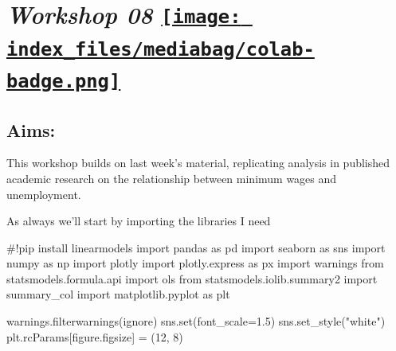 \documentclass[
  letterpaper,
  DIV=11,
  numbers=noendperiod]{scrreprt}
\newenvironment{Shaded}{\begin{snugshade}}{\end{snugshade}}
\newcommand{\BuiltInTok}[1]{\textcolor[rgb]{0.00,0.23,0.31}{#1}}
\newcommand{\CommentTok}[1]{\textcolor[rgb]{0.37,0.37,0.37}{#1}}
\newcommand{\DecValTok}[1]{\textcolor[rgb]{0.68,0.00,0.00}{#1}}
\newcommand{\FloatTok}[1]{\textcolor[rgb]{0.68,0.00,0.00}{#1}}
\newcommand{\ImportTok}[1]{\textcolor[rgb]{0.00,0.46,0.62}{#1}}
\newcommand{\NormalTok}[1]{\textcolor[rgb]{0.00,0.23,0.31}{#1}}
\newcommand{\OperatorTok}[1]{\textcolor[rgb]{0.37,0.37,0.37}{#1}}
\newcommand{\StringTok}[1]{\textcolor[rgb]{0.13,0.47,0.30}{#1}}
\begin{document}
\hypertarget{workshop-08-open-in-colab}{%
\section[\emph{Workshop 08} ]{\texorpdfstring{\emph{Workshop 08}
\href{https://colab.research.google.com/github/oballinger/QM2/blob/main/notebooks/W08.\%20Diff-in-Diff.ipynb}{\protect\texttt{[image: index\_files/mediabag/colab-badge.png]}}}{Workshop 08 Open In Colab}}\label{workshop-08-open-in-colab}}

\hypertarget{aims-6}{%
\subsection{Aims:}\label{aims-6}}

This workshop builds on last week's material, replicating analysis in
published academic research on the relationship between minimum wages
and unemployment.

As always we'll start by importing the libraries I need

\begin{Shaded}
\begin{Highlighting}[]
\CommentTok{\#!pip install linearmodels}
\ImportTok{import}\NormalTok{ pandas }\ImportTok{as}\NormalTok{ pd}
\ImportTok{import}\NormalTok{ seaborn }\ImportTok{as}\NormalTok{ sns}
\ImportTok{import}\NormalTok{ numpy }\ImportTok{as}\NormalTok{ np}
\ImportTok{import}\NormalTok{ plotly}
\ImportTok{import}\NormalTok{ plotly.express }\ImportTok{as}\NormalTok{ px}
\ImportTok{import}\NormalTok{ warnings}
\ImportTok{from}\NormalTok{ statsmodels.formula.api }\ImportTok{import}\NormalTok{ ols}
\ImportTok{from}\NormalTok{ statsmodels.iolib.summary2 }\ImportTok{import}\NormalTok{ summary\_col}
\ImportTok{import}\NormalTok{ matplotlib.pyplot }\ImportTok{as}\NormalTok{ plt}

\NormalTok{warnings.filterwarnings(}\StringTok{\textquotesingle{}ignore\textquotesingle{}}\NormalTok{)}
\NormalTok{sns.}\BuiltInTok{set}\NormalTok{(font\_scale}\OperatorTok{=}\FloatTok{1.5}\NormalTok{)}
\NormalTok{sns.set\_style(}\StringTok{"white"}\NormalTok{)}
\NormalTok{plt.rcParams[}\StringTok{\textquotesingle{}figure.figsize\textquotesingle{}}\NormalTok{] }\OperatorTok{=}\NormalTok{ (}\DecValTok{12}\NormalTok{, }\DecValTok{8}\NormalTok{)}
\end{Highlighting}
\end{Shaded}
\end{document}
